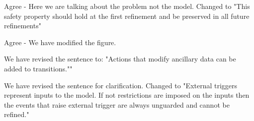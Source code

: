 \documentclass{response}
\begin{document}
\begin{response}
	Agree - Here we are talking about the problem not the model. Changed to "This safety property should hold at the first refinement and be preserved in all future refinements"
\end{response}

\begin{comment}{Reviewer \#3}
* Figure 2(b): "last_byte_send" -> "last_byte_sent".
\end{comment}

\begin{response}
  Agree - We have modified the figure.
\end{response}

\begin{comment}{Reviewer \#3}
  Page 7:

  * Mid: "Ancillary data, with corresponding actions to alter it, can
  ..." - something is wrong with this sentence.
\end{comment}

\begin{response}
  We have revised the sentence to: "Actions that modify ancillary data can be added to transitions.""
\end{response}

\begin{comment}{Reviewer \#3}
* Line -4: I don't understand: "Note that external triggers are always unguarded ...".
\end{comment}

\begin{response}
  We have revised the sentence for clarification. Changed to "External triggers represent inputs to the model. If not restrictions are imposed on the inputs then the events that raise external trigger are always unguarded and cannot be refined."
\end{response}

\begin{comment}{Reviewer \#3}
  Page 8:

* The next couple of pages is a lot of English without some structure to hang it up on.
\end{comment}

\begin{response}
\end{response}
\end{document}
